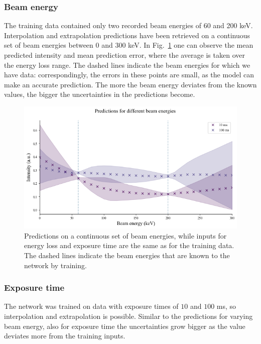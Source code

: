 \subsubsection{Beam energy}
\label{sec:ebeam}
The training data contained only two recorded beam energies of 60 and 200 keV. Interpolation and extrapolation predictions have been retrieved on a continuous set of beam energies between 0 and 300 keV. In Fig.~\ref{fig:extrapolbeam} one can observe the mean predicted intensity and mean prediction error, where the average is taken over the energy loss range. The dashed lines indicate the beam energies for which we have data: correspondingly, the errors in these points are small, as the model can make an accurate prediction. The more the beam energy deviates from the known values, the bigger the uncertainties in the predictions become. 

\begin{figure}[H]
    \centering
    \includegraphics[width=120mm]{plots/Extrapolate_beamenergy.png}
    \caption{Predictions on a continuous set of beam energies, while inputs for energy loss and exposure time are the same as for the training data. The dashed lines indicate the beam energies that are known to the network by training.}
    \label{fig:extrapolbeam}
\end{figure}

\subsubsection{Exposure time}
\label{sec:texp}
The network was trained on data with exposure times of $10$ and $100$ ms, so interpolation and extrapolation is possible. Similar to the predictions for varying beam energy, also for exposure time the uncertainties grow bigger as the value deviates more from the training inputs.

